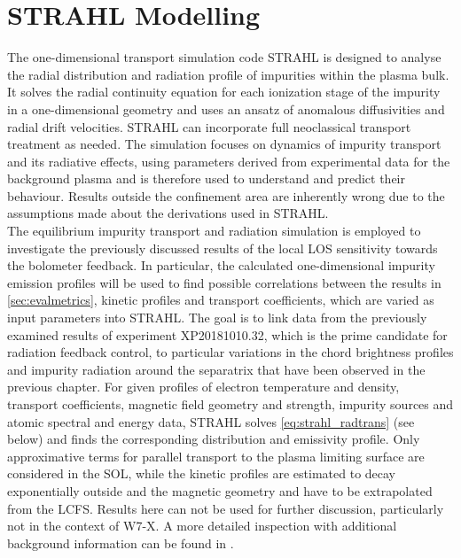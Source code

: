     \section{STRAHL Modelling}\label{sec:strahlmodel}%
%
        The one-dimensional transport simulation code STRAHL is designed to analyse the radial distribution and radiation profile of impurities within the plasma bulk. It solves the radial continuity equation for each ionization stage of the impurity in a one-dimensional geometry and uses an ansatz of anomalous diffusivities and radial drift velocities. STRAHL can incorporate full neoclassical transport treatment as needed. The simulation focuses on dynamics of impurity transport and its radiative effects, using parameters derived from experimental data for the background plasma and is therefore used to understand and predict their behaviour. Results outside the confinement area are inherently wrong due to the assumptions made about the derivations used in STRAHL.\\%
        The equilibrium impurity transport and radiation simulation is employed to investigate the previously discussed results of the local LOS sensitivity towards the bolometer feedback. In particular, the calculated one-dimensional impurity emission profiles will be used to find possible correlations between the results in \cref{sec:evalmetrics}, kinetic profiles and transport coefficients, which are varied as input parameters into STRAHL. The goal is to link data from the previously examined results of experiment XP20181010.32, which is the prime candidate for radiation feedback control, to particular variations in the chord brightness profiles and impurity radiation around the separatrix that have been observed in the previous chapter. For given profiles of electron temperature and density, transport coefficients, magnetic field geometry and strength, impurity sources and atomic spectral and energy data, STRAHL solves \cref{eq:strahl_radtrans} (see below) and finds the corresponding distribution and emissivity profile. Only approximative terms for parallel transport to the plasma limiting surface are considered in the SOL, while the kinetic profiles are estimated to decay exponentially outside and the magnetic geometry and have to be extrapolated from the LCFS. Results here can not be used for further discussion, particularly not in the context of W7-X. A more detailed inspection with additional background information can be found in \cite{Dux2006,Goncharov2007,Behringer1987}.%
%
